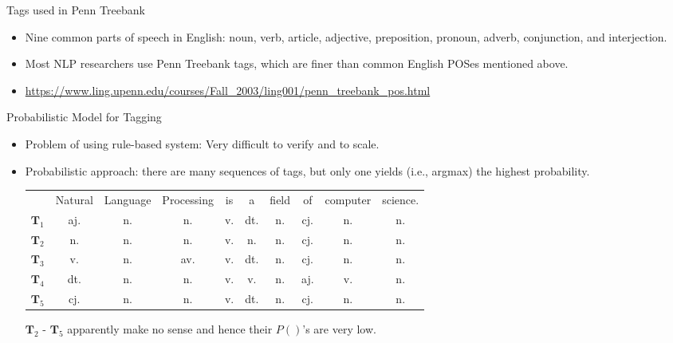 \documentclass[11pt]{beamer}
\begin{document}
\begin{frame}{Tags used in Penn Treebank}
 \begin{itemize}[<+->]
  \item Nine common parts of speech in English:  noun, verb, article, adjective, preposition, pronoun, adverb, conjunction, and interjection. 
  \item Most NLP researchers use Penn Treebank tags, which are finer than common English POSes mentioned above. 
  \item \url{https://www.ling.upenn.edu/courses/Fall_2003/ling001/penn_treebank_pos.html}
 \end{itemize}
\end{frame}

\begin{frame}{Probabilistic Model for Tagging}

\begin{itemize}[<+->]
 \item Problem of using rule-based system: Very difficult to verify and to scale. 
 \item Probabilistic approach: there are many sequences of tags,  but only one yields (i.e., argmax) the highest probability. %
 
 \begin{tabular}{cccccccccc}
~ &  \scriptsize Natural & \scriptsize Language & \scriptsize Processing &  is &  a & \scriptsize field &  of & \scriptsize computer & \scriptsize science.  \\
$\mathbf{T}_1$ & aj. & n. & n. & v.  & dt. & n. & cj. & n. & n. \\
$\mathbf{T}_2$ & n. & n. & n. & v.  & n. & n. & cj. & n. & n. \\
$\mathbf{T}_3$ & v. & n. & av. & v.  & dt. & n. & cj. & n. & n. \\
$\mathbf{T}_4$ & dt. & n. & n. & v.  & v. & n. & aj. & v. & n.\\ 
$\mathbf{T}_5$ & cj. & n. & n. & v.  & dt. & n. & cj. & n. & n.
\end{tabular} 
 
$\mathbf{T}_2$ - $\mathbf{T}_5$ apparently make no sense and hence their $P()$'s are very low. 
 

% 




\end{itemize}
\end{frame}
\end{document}
